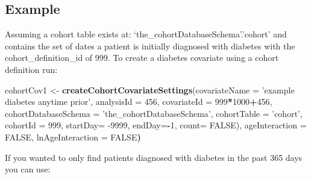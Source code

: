 \documentclass[
]{article}
\newenvironment{Shaded}{\begin{snugshade}}{\end{snugshade}}
\newcommand{\DataTypeTok}[1]{\textcolor[rgb]{0.13,0.29,0.53}{#1}}
\newcommand{\DecValTok}[1]{\textcolor[rgb]{0.00,0.00,0.81}{#1}}
\newcommand{\ErrorTok}[1]{\textcolor[rgb]{0.64,0.00,0.00}{\textbf{#1}}}
\newcommand{\KeywordTok}[1]{\textcolor[rgb]{0.13,0.29,0.53}{\textbf{#1}}}
\newcommand{\NormalTok}[1]{#1}
\newcommand{\OperatorTok}[1]{\textcolor[rgb]{0.81,0.36,0.00}{\textbf{#1}}}
\newcommand{\OtherTok}[1]{\textcolor[rgb]{0.56,0.35,0.01}{#1}}
\newcommand{\StringTok}[1]{\textcolor[rgb]{0.31,0.60,0.02}{#1}}
\begin{document}
\hypertarget{example}{%
\subsection{Example}\label{example}}

Assuming a cohort table exists at: `the\_cohortDatabaseSchema'.'cohort'
and contains the set of dates a patient is initially diagnosed with
diabetes with the cohort\_definition\_id of 999. To create a diabetes
covariate using a cohort definition run:

\begin{Shaded}
\begin{Highlighting}[]
\NormalTok{cohortCov1 <-}\StringTok{ }\KeywordTok{createCohortCovariateSettings}\NormalTok{(}\DataTypeTok{covariateName =} \StringTok{'example diabetes anytime prior'}\NormalTok{,}
                                                        \DataTypeTok{analysisId =} \DecValTok{456}\NormalTok{,}
                                                        \DataTypeTok{covariateId =} \DecValTok{999}\OperatorTok{*}\DecValTok{1000}\OperatorTok{+}\DecValTok{456}\NormalTok{,}
                                                      \DataTypeTok{cohortDatabaseSchema =} \StringTok{'the_cohortDatabaseSchema'}\NormalTok{,}
                                                      \DataTypeTok{cohortTable =} \StringTok{'cohort'}\NormalTok{,}
                                                      \DataTypeTok{cohortId =} \DecValTok{999}\NormalTok{,}
                                                      \DataTypeTok{startDay=} \DecValTok{-9999}\NormalTok{, }
                                                      \DataTypeTok{endDay=}\OperatorTok{-}\DecValTok{1}\NormalTok{,}
                                                      \DataTypeTok{count=} \OtherTok{FALSE}\NormalTok{), }
\NormalTok{                                                      ageInteraction =}\StringTok{ }\OtherTok{FALSE}\NormalTok{,}
\NormalTok{                                                      lnAgeInteraction =}\StringTok{ }\OtherTok{FALSE}\ErrorTok{)}
\end{Highlighting}
\end{Shaded}

If you wanted to only find patients diagnosed with diabetes in the past
365 days you can use:
\end{document}

